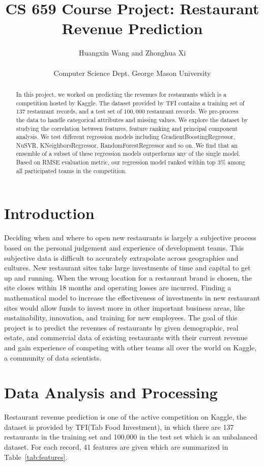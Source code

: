 \documentclass[10pt, oneside]{article}   	%
\title{CS 659 Course Project: Restaurant Revenue Prediction}
\author{Huangxin Wang and Zhonghua Xi \\
\\
Computer Science Dept. George Mason University}
\newcommand\tabref{Table~\ref}
\begin{document}
\maketitle

\begin{abstract}
In this project, we worked on predicting the revenues for restaurants which is a competition hosted by Kaggle. The dataset provided by TFI contains a training set of  $137$ restaurant records, and a test set of $100, 000$  restaurant records. We pre-process the data to handle categorical attributes and missing values. We explore the dataset by studying the correlation between features, feature ranking and principal component analysis. We test different regression models including GradientBoostingRegressor, NuSVR, KNeighborsRegressor, RandomForestRegressor and so on. We find that an ensemble of a subset of these regression models outperforms any of the single model. Based on RMSE evaluation metric, our regression model ranked within top $3\%$ among all participated teams in the competition.
\end{abstract}

\section{Introduction}
Deciding when and where to open new restaurants is largely a subjective process based on the personal judgement and experience of development teams. 
This subjective data is difficult to accurately extrapolate across geographies and cultures.
New restaurant sites take large investments of time and capital to get up and running. 
When the wrong location for a restaurant brand is chosen, the site closes within 18 months and operating losses are incurred. 
Finding a mathematical model to increase the effectiveness of investments in new restaurant sites would allow funds to invest more in other important business areas, like sustainability, innovation, and training for new employees.
The goal of this project is to predict the revenues of restaurants by given demographic, real estate, and commercial data of existing restaurants with their current revenue and gain experience of competing with other teams all over the world on Kaggle, a community of data scientists.

\section{Data Analysis and Processing}
Restaurant revenue prediction is one of the active competition on Kaggle,
the dataset is provided by TFI(Tab Food Investment),
in which there are 137 restaurants in the training set and 100,000 in the test set which is an unbalanced dataset. 
For each record, 41 features are given which are summarized in \tabref{tab:features}.
\end{document}
